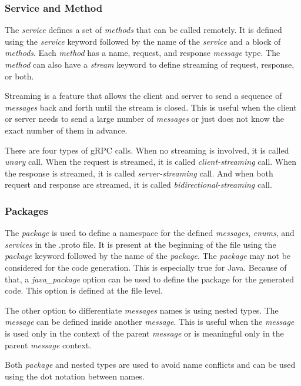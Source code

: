 \subsubsection{Service and Method}
The \textit{service} defines a set of \textit{methods} that can be called remotely.
It is defined using the \textit{service} keyword followed by the name of the \textit{service} and a block of \textit{methods}.
Each \textit{method} has a name, request, and response \textit{message} type.
The \textit{method} can also have a \textit{stream} keyword to define streaming of request, response, or both.
\cite{protobuf-proto3}

Streaming is a feature that allows the client and server to send a sequence of \textit{messages} back and forth until the stream is closed.
This is useful when the client or server needs to send a large number of \textit{messages} or just does not know the exact number of them in advance.
\cite{protobuf-proto3}

There are four types of gRPC calls.
When no streaming is involved, it is called \textit{unary} call.
When the request is streamed, it is called \textit{client-streaming} call.
When the response is streamed, it is called \textit{server-streaming} call.
And when both request and response are streamed, it is called \textit{bidirectional-streaming} call.
\cite{grpc-core-concept}

\subsubsection{Packages}
The \textit{package} is used to define a namespace for the defined \textit{messages}, \textit{enums}, and \textit{services} in the .proto file.
It is present at the beginning of the file using the \textit{package} keyword followed by the name of the \textit{package}.
The \textit{package} may not be considered for the code generation.
This is especially true for Java.
Because of that, a \textit{java\_package} option can be used to define the package for the generated code.
This option is defined at the file level.
\cite{protobuf-proto3}

The other option to differentiate \textit{messages} names is using nested types.
The \textit{message} can be defined inside another \textit{message}.
This is useful when the \textit{message} is used only in the context of the parent \textit{message} or is meaningful only in the parent \textit{message} context.
\cite{protobuf-proto3}

Both \textit{package} and nested types are used to avoid name conflicts and can be used using the dot notation between names.

